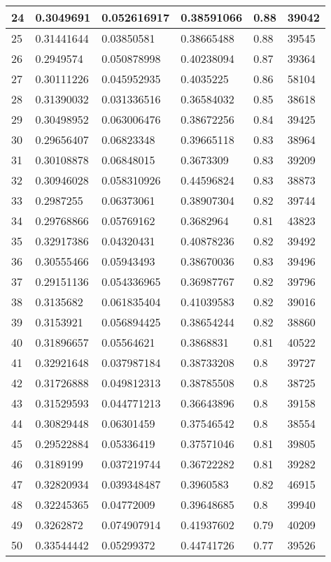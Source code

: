 \begin{longtable}{|l|l|l|l|l|l|}
24 & 0.3049691 & 0.052616917 & 0.38591066 & 0.88 & 39042 \\ \hline 
25 & 0.31441644 & 0.03850581 & 0.38665488 & 0.88 & 39545 \\ \hline 
26 & 0.2949574 & 0.050878998 & 0.40238094 & 0.87 & 39364 \\ \hline 
27 & 0.30111226 & 0.045952935 & 0.4035225 & 0.86 & 58104 \\ \hline 
28 & 0.31390032 & 0.031336516 & 0.36584032 & 0.85 & 38618 \\ \hline 
29 & 0.30498952 & 0.063006476 & 0.38672256 & 0.84 & 39425 \\ \hline 
30 & 0.29656407 & 0.06823348 & 0.39665118 & 0.83 & 38964 \\ \hline 
31 & 0.30108878 & 0.06848015 & 0.3673309 & 0.83 & 39209 \\ \hline 
32 & 0.30946028 & 0.058310926 & 0.44596824 & 0.83 & 38873 \\ \hline 
33 & 0.2987255 & 0.06373061 & 0.38907304 & 0.82 & 39744 \\ \hline 
34 & 0.29768866 & 0.05769162 & 0.3682964 & 0.81 & 43823 \\ \hline 
35 & 0.32917386 & 0.04320431 & 0.40878236 & 0.82 & 39492 \\ \hline 
36 & 0.30555466 & 0.05943493 & 0.38670036 & 0.83 & 39496 \\ \hline 
37 & 0.29151136 & 0.054336965 & 0.36987767 & 0.82 & 39796 \\ \hline 
38 & 0.3135682 & 0.061835404 & 0.41039583 & 0.82 & 39016 \\ \hline 
39 & 0.3153921 & 0.056894425 & 0.38654244 & 0.82 & 38860 \\ \hline 
40 & 0.31896657 & 0.05564621 & 0.3868831 & 0.81 & 40522 \\ \hline 
41 & 0.32921648 & 0.037987184 & 0.38733208 & 0.8 & 39727 \\ \hline 
42 & 0.31726888 & 0.049812313 & 0.38785508 & 0.8 & 38725 \\ \hline 
43 & 0.31529593 & 0.044771213 & 0.36643896 & 0.8 & 39158 \\ \hline 
44 & 0.30829448 & 0.06301459 & 0.37546542 & 0.8 & 38554 \\ \hline 
45 & 0.29522884 & 0.05336419 & 0.37571046 & 0.81 & 39805 \\ \hline 
46 & 0.3189199 & 0.037219744 & 0.36722282 & 0.81 & 39282 \\ \hline 
47 & 0.32820934 & 0.039348487 & 0.3960583 & 0.82 & 46915 \\ \hline 
48 & 0.32245365 & 0.04772009 & 0.39648685 & 0.8 & 39940 \\ \hline 
49 & 0.3262872 & 0.074907914 & 0.41937602 & 0.79 & 40209 \\ \hline 
50 & 0.33544442 & 0.05299372 & 0.44741726 & 0.77 & 39526 \\ \hline 
\end{longtable}